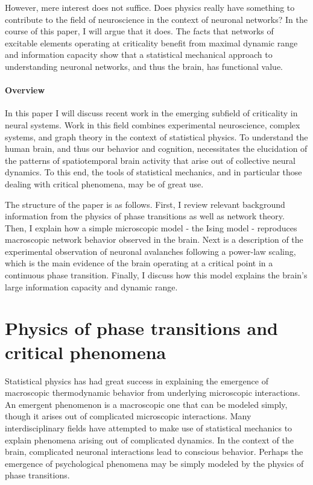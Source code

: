 \documentclass[12pt]{article}
\begin{document}
However, mere interest does not suffice. Does physics really have something to contribute to the field of neuroscience in the context of neuronal networks? In the course of this paper, I will argue that it does. The facts that networks of excitable elements operating at criticality benefit from maximal dynamic range \cite{Kinouchi2006b,Shew2009b} and information capacity\cite{Shew2011a} show that a statistical mechanical approach to understanding neuronal networks, and thus the brain, has functional value.

\paragraph*{Overview} In this paper I will discuss recent work in the emerging subfield of criticality in neural systems. Work in this field combines experimental neuroscience, complex systems, and graph theory in the context of statistical physics. To understand the human brain, and thus our behavior and cognition, necessitates the elucidation of the patterns of spatiotemporal brain activity that arise out of collective neural dynamics. To this end, the tools of statistical mechanics, and in particular those dealing with critical phenomena, may be of great use.

The structure of the paper is as follows. First, I review relevant background information from the physics of phase transitions as well as network theory. Then, I explain how a simple microscopic model - the Ising model - reproduces macroscopic network behavior observed in the brain. Next is a description of the experimental observation of neuronal avalanches following a power-law scaling, which is the main evidence of the brain operating at a critical point in a continuous phase transition. Finally, I discuss how this model explains the brain's large information capacity and dynamic range.

\section*{Physics of phase transitions and critical phenomena}

Statistical physics has had great success in explaining the emergence of macroscopic thermodynamic behavior from underlying microscopic interactions. An emergent phenomenon is a macroscopic one that can be modeled simply, though it arises out of complicated microscopic interactions. Many interdisciplinary fields have attempted to make use of statistical mechanics to explain phenomena arising out of complicated dynamics. In the context of the brain, complicated neuronal interactions lead to conscious behavior. Perhaps the emergence of psychological phenomena may be simply modeled by the physics of phase transitions.
\end{document}
